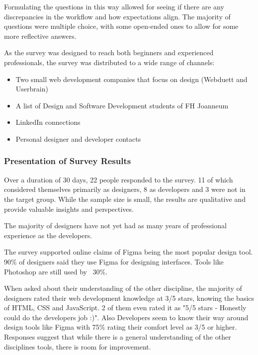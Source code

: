 Formulating the questions in this way allowed for seeing if there are any discrepancies in the
workflow and how expectations align. The majority of questions were multiple choice, with some
open-ended ones to allow for some more reflective answers.

As the survey was designed to reach both beginners and experienced professionals, the survey was
distributed to a wide range of channels:
\begin{itemize}
    \item Two small web development companies that focus on design (Webduett and Userbrain)
    \item A list of Design and Software Development students of FH Joanneum
    \item LinkedIn connections
    \item Personal designer and developer contacts
\end{itemize}


\subsubsection{Presentation of Survey Results}
Over a duration of 30 days, 22 people responded to the survey. 11 of which considered themselves
primarily as designers, 8 as developers and 3 were not in the target group. While the sample size is
small, the results are qualitative and provide valuable insights and perspectives.

The majority of designers have not yet had as many years of professional experience as the
developers.  %

The survey supported online claims of Figma being the most popular design tool. 90\% of designers
said they use Figma for designing interfaces. Tools like Photoshop are still used by ~30\%.

When asked about their understanding of the other discipline, the majority of designers rated their
web development knowledge at 3/5 stars, knowing the basics of HTML, CSS and JavaScript. 2 of
them even rated it as "5/5 stars - Honestly could do the developers job :)". Also Developers seem to
know their way around design tools like Figma with 75\% rating their comfort level as 3/5 or higher.
Responses suggest that while there is a general understanding of the other disciplines tools, there
is room for improvement.

